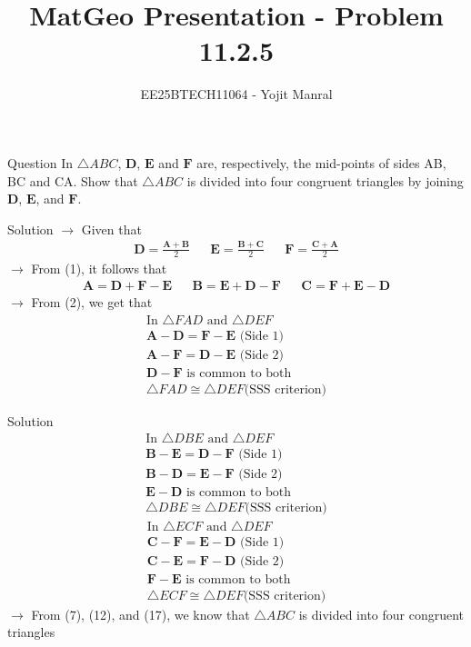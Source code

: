 \documentclass{beamer}
\title{MatGeo Presentation - Problem 11.2.5}
\author{EE25BTECH11064 - Yojit Manral}
\date{}
\numberwithin{equation}{section}
\theoremstyle{remark}
\let\vec\mathbf
\begin{document}
\frame{\titlepage}
\begin{frame}{Question}
In $\triangle ABC$, $\vec{D}$, $\vec{E}$ and $\vec{F}$ are, respectively, the mid-points of sides AB, BC and CA. Show that $\triangle ABC$ is divided into four congruent triangles by joining $\vec{D}$, $\vec{E}$, and $\vec{F}$.
\end{frame}

\begin{frame}{Solution}
$\rightarrow$ Given that
\begin{align}
    \vec{D} = \frac{\vec{A}+\vec{B}}{2} && \vec{E} = \frac{\vec{B}+\vec{C}}{2} && \vec{F} = \frac{\vec{C}+\vec{A}}{2}
\end{align}
$\rightarrow$ From (1), it follows that
\begin{align}
    \vec{A} = \vec{D}+\vec{F}-\vec{E} && \vec{B} = \vec{E}+\vec{D}-\vec{F} && \vec{C} = \vec{F}+\vec{E}-\vec{D}
\end{align}
$\rightarrow$ From (2), we get that
\begin{align}
    \text{In }\triangle FAD\text{ and }\triangle DEF \\
    \vec{A}-\vec{D} = \vec{F}-\vec{E}\text{ (Side 1)} \\
    \vec{A}-\vec{F} = \vec{D}-\vec{E}\text{ (Side 2)} \\
    \vec{D}-\vec{F}\text{ is common to both} \\
    \triangle FAD \cong \triangle DEF\text{(SSS criterion)}
\end{align}
\end{frame}

\begin{frame}{Solution}
\begin{align}
    \text{In }\triangle DBE\text{ and }\triangle DEF \\
    \vec{B}-\vec{E} = \vec{D}-\vec{F}\text{ (Side 1)} \\
    \vec{B}-\vec{D} = \vec{E}-\vec{F}\text{ (Side 2)} \\
    \vec{E}-\vec{D}\text{ is common to both} \\
    \triangle DBE \cong \triangle DEF\text{(SSS criterion)}
\end{align}
\begin{align}
    \text{In }\triangle ECF\text{ and }\triangle DEF \\
    \vec{C}-\vec{F} = \vec{E}-\vec{D}\text{ (Side 1)} \\
    \vec{C}-\vec{E} = \vec{F}-\vec{D}\text{ (Side 2)} \\
    \vec{F}-\vec{E}\text{ is common to both} \\
    \triangle ECF \cong \triangle DEF\text{(SSS criterion)}
\end{align}
$\rightarrow$ From (7), (12), and (17), we know that $\triangle ABC$ is divided into four congruent triangles
\end{frame}
\end{document}
